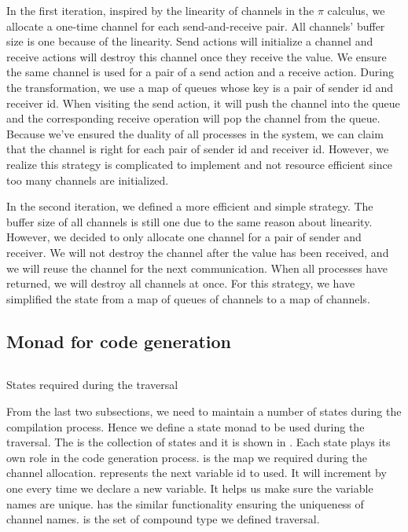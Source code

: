 In the first iteration, inspired by the linearity of channels in the $\pi$ calculus, we allocate a one-time channel for each send-and-receive pair. All channels' buffer size is one because of the linearity. Send actions will initialize a channel and receive actions will destroy this channel once they receive the value. We ensure the same channel is used for a pair of a send action and a receive action. During the transformation, we use a map of queues whose key is a pair of sender id  and receiver id. When visiting the send action, it will push the channel into the queue and the corresponding receive operation will pop the channel from the queue. Because we've ensured the duality of all processes in the system, we can claim that the channel is right for each pair of sender id and receiver id. However, we realize this strategy is complicated to implement and not resource efficient since too many channels are initialized.

In the second iteration, we defined a more efficient and simple strategy. The buffer size of all channels is still one due to the same reason about linearity. However, we decided to only allocate one channel for a pair of sender and receiver. We will not destroy the channel after the value has been received, and we will reuse the channel for the next communication. When all processes have returned, we will destroy all channels at once. For this strategy, we have simplified the state from a map of queues of channels to a map of channels.
\subsection{Monad for code generation}
\begin{listing}[ht]
    \inputminted{Haskell}{codegen/monad.hs} 
    \caption{States required during the traversal}
    \label{codegen:code:monad}
\end{listing}
From the last two subsections, we need to maintain a number of states during the compilation process. Hence we define a state monad to be used during the traversal. The  is the collection of states and it is shown in . Each state plays its own role in the code generation process.  is the map we required during the channel allocation.  represents the next variable id to used. It will increment by one every time we declare a new variable. It helps us make sure the variable names are unique.  has the similar functionality ensuring the uniqueness of channel names.  is the set of compound type we defined traversal.

